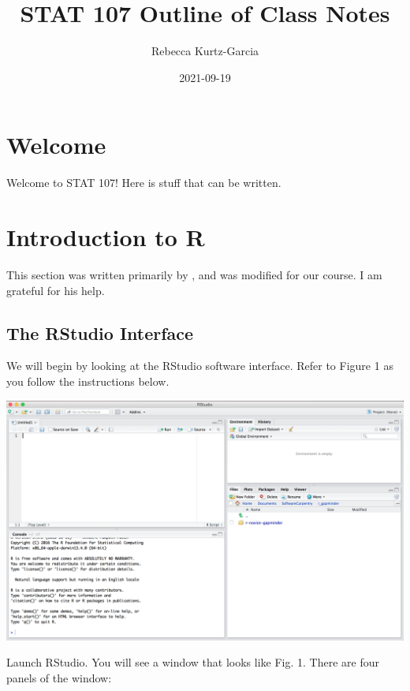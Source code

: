 \documentclass[
]{book}
\title{STAT 107 Outline of Class Notes}
\author{Rebecca Kurtz-Garcia}
\date{2021-09-19}
\begin{document}
\maketitle

{
\setcounter{tocdepth}{1}
\tableofcontents
}
\hypertarget{welcome}{%
\chapter*{Welcome}\label{welcome}}

Welcome to STAT 107! Here is stuff that can be written.

\hypertarget{introduction-to-r}{%
\chapter{Introduction to R}\label{introduction-to-r}}

This section was written primarily by \citet{Desharnais2020}, and was modified for our course. I am grateful for his help.

\hypertarget{the-rstudio-interface}{%
\section{\texorpdfstring{The \textbf{RStudio} Interface}{The RStudio Interface}}\label{the-rstudio-interface}}

We will begin by looking at the RStudio software interface. Refer to Figure 1 as you follow the instructions below.

\includegraphics[width=35.53in]{images/rstudio}

Launch RStudio. You will see a window that looks like Fig. 1. There are four panels of the window:
\end{document}
